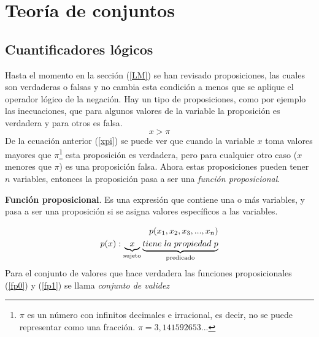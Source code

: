 \chapter{Teoría de conjuntos}
\label{TC}


\section{Cuantificadores lógicos}
\label{TC0}

Hasta el momento en la sección (\ref{LM}) se han revisado proposiciones, las cuales son verdaderas o falsas y no cambia esta condición a menos que se aplique el operador lógico de la negación. Hay un tipo de proposiciones, como por ejemplo las inecuaciones, que para algunos valores de la variable la proposición es verdadera y para otros es falsa.
\begin{equation}
x > \pi
\label{xpi}
\end{equation}
De la ecuación anterior (\ref{xpi}) se puede ver que cuando la variable $x$ toma valores mayores que $\pi$\footnote{$\pi$ es un número con infinitos decimales e irracional, es decir, no se puede representar como una fracción. $\pi=3,141592653...$} esta proposición es verdadera, pero para cualquier otro caso ($x$ menores que $\pi$) es una proposición falsa. Ahora estas proposiciones pueden tener $n$ variables, entonces la proposición pasa a ser una \textit{función proposicional}.

\begin{mydef}
\textbf{Función proposicional}. Es una expresión que contiene una o más variables, y pasa a ser una proposición si se asigna valores específicos a las variables.
\end{mydef}
\begin{eqnarray}
p(x_{1},x_{2},x_{3},...,x_{n})\label{fp0}\\
p(x): \underbrace{x}_\text{sujeto} \underbrace{tiene\hspace{3px} la\hspace{3px} propiedad\hspace{3px} p}_\text{predicado}
\label{fp1}
\end{eqnarray}
Para el conjunto de valores que hace verdadera las funciones proposicionales (\ref{fp0}) y (\ref{fp1}) se llama \textit{conjunto de validez}

